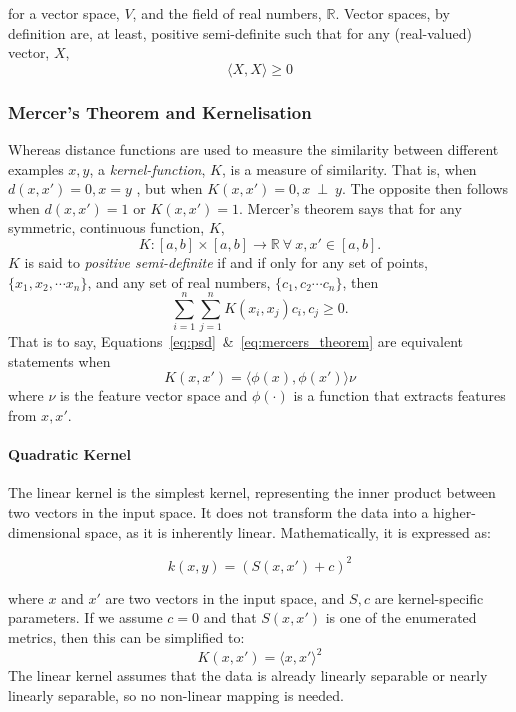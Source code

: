 \documentclass[conference]{IEEEtran}
\begin{document}
for a vector space, $V$, and the field of real numbers, $\mathbb{R}$. 
Vector spaces, by definition are, at least, positive semi-definite such that for any (real-valued) vector, $X$, 
\begin{equation}
\langle X, X \rangle \geq 0
\label{eq:psd}
\end{equation}

\subsubsection{Mercer's Theorem and Kernelisation}
\label{kernels}
Whereas distance functions are used to measure the similarity between different examples $x,y$, a \textit{kernel-function}, $K$, is a measure of similarity. That is, when $d(x,x') = 0, x = y$ , but when $K(x,x') = 0, x~\perp~y$. The opposite then follows when $d(x,x')=1$ or $K(x,x')=1$. Mercer's theorem says that for any symmetric, continuous function, $K$,
$$
K : [a, b] \times [a, b] \rightarrow \mathbb{R}~\forall~x,x' \in [a,b].
$$
$K$ is said to \textit{positive semi-definite} if and if only for any set of points, $\{x_1, x_2, \cdots x_n\}$, and any set of real numbers, $\{ c_1, c_2 \cdots c_n\}$, then
\begin{equation}
\sum_{i=1}^n \sum_{j=1}^n K(x_i, x_j) c_i, c_j \geq 0.
\label{eq:mercers_theorem}
\end{equation}
That is to say, Equations~\ref{eq:psd}~\&~\ref{eq:mercers_theorem} are equivalent statements when 
$$
K(x, x') = \langle \phi(x), \phi(x') \rangle \nu
$$
where $\nu$ is the feature vector space and $\phi(\cdot)$ is a function that extracts features from $x,x'$.

\paragraph{Quadratic Kernel}
\label{linear_kernel}
The linear kernel is the simplest kernel, representing the inner product between two vectors in the input space. It does not transform the data into a higher-dimensional space, as it is inherently linear. Mathematically, it is expressed as:

$$
k(x, y) = (S(x, x') + c)^2
$$

where $x$ and $x'$ are two vectors in the input space, and $S, c$ are kernel-specific parameters. 
If we assume $c=0$ and that $S(x,x')$ is one of the enumerated metrics, then this can be simplified to:
$$
K(x, x') = \langle x, x' \rangle ^2
$$
The linear kernel assumes that the data is already linearly separable or nearly linearly separable, so no non-linear mapping is needed. 
\end{document}

